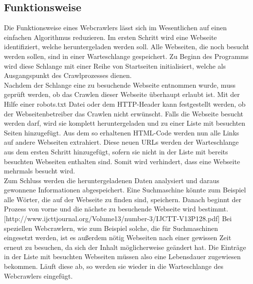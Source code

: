 \subsection{Funktionsweise}
Die Funktionsweise eines Webcrawlers lässt sich im Wesentlichen auf einen einfachen Algorithmus reduzieren. Im ersten Schritt wird eine Webseite identifiziert, welche heruntergeladen werden soll. Alle Webseiten, die noch besucht werden sollen, sind in einer Warteschlange gespeichert. Zu Beginn des Programms wird diese Schlange mit einer Reihe von Startseiten initialisiert, welche als Ausgangspunkt des Crawlprozesses dienen.\\
Nachdem der Schlange eine zu besuchende Webseite entnommen wurde, muss geprüft werden, ob das Crawlen dieser Webseite überhaupt erlaubt ist. Mit der Hilfe einer robots.txt Datei oder dem HTTP-Header kann festgestellt werden, ob der Webseitenbetreiber das Crawlen nicht erwünscht. Falls die Webseite besucht werden darf, wird sie komplett heruntergeladen und zu einer Liste mit besuchten Seiten hinzugefügt. Aus dem so erhaltenen HTML-Code werden nun alle Links auf andere Webseiten extrahiert. Diese neuen URLs werden der Warteschlange aus dem ersten Schritt hinzugefügt, sofern sie nicht in der Liste mit bereits besuchten Webseiten enthalten sind. Somit wird verhindert, dass eine Webseite mehrmals besucht wird. \\
Zum Schluss werden die heruntergeladenen Daten analysiert und daraus gewonnene Informationen abgespeichert. Eine Suchmaschine könnte zum Beispiel alle Wörter, die auf der Webseite zu finden sind, speichern. Danach beginnt der Prozess von vorne und die nächste zu besuchende Webseite wird bestimmt. [http://www.ijcttjournal.org/Volume13/number-3/IJCTT-V13P128.pdf]
Bei speziellen Webcrawlern, wie zum Beispiel solche, die für Suchmaschinen eingesetzt werden, ist es außerdem nötig Webseiten nach einer gewissen Zeit erneut zu besuchen, da sich der Inhalt möglicherweise geändert hat. Die Einträge in der Liste mit besuchten Webseiten müssen also eine Lebensdauer zugewiesen bekommen. Läuft diese ab, so werden sie wieder in die Warteschlange des Webcrawlers eingefügt.
